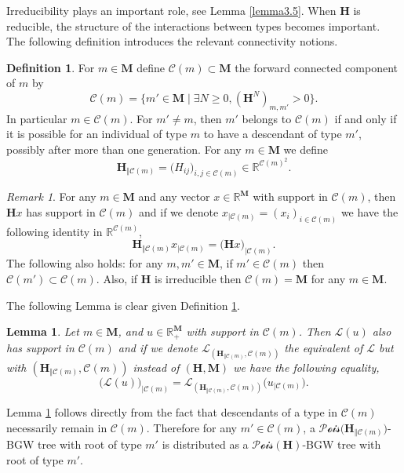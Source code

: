 \documentclass[reqno,final,11pt]{amsart}
\theoremstyle{plain}
\newtheorem{lemma}[theorem]{Lemma}
\theoremstyle{definition}
\newtheorem{definition}[theorem]{Definition}
\theoremstyle{remark}
\newtheorem{remark}[theorem]{Remark}
\newcommand{\R}{\mathds{R}}
\newcommand{\M}{\bm{M}}
\newcommand{\C}{\mathcal{C}}
\renewcommand{\L}{\bm{\mathscr{L}}}
\renewcommand{\H}{\bm{H}}
\newcommand{\pos}{\R_+^{\M}}
\newcommand{\Pois}{\mathscr{P}\!\mathscr{o}\!\mathscr{i}\!\mathscr{s}}
\begin{document}
Irreducibility plays an important role, see Lemma \ref{lemma3.5}. When $\H$ is reducible, the structure of the interactions between types becomes important. The following definition introduces the relevant connectivity notions.

\begin{definition}\label{definition5.3}
	For $m\in\M$ define $\C(m) \subset \M$ the forward connected component of $m$ by
	\begin{equation}
		\C(m) = \{ m'\in\M \mid \exists N \geq 0, (\H^N)_{m,m'} >0\}.
	\end{equation}
	In particular $m\in\C(m)$. For $m'\neq m$, then $m'$ belongs to $\C(m)$ if and only if it is possible for an individual of type $m$ to have a descendant of type $m'$, possibly after more than one generation. For any $m\in\M$ we define
	\begin{equation}
		\H_{\Vert \C(m)} = \big( H_{ij} \big)_{i,j \in \C(m)} \in \R^{\C(m)^2}.
	\end{equation}
\end{definition}

\begin{remark}\label{rmk7.8}
	For any $m\in\M$ and any vector $x\in\R^{\M}$ with support in $\C(m)$, then $\H x$ has support in $\C(m)$ and if we denote $x_{\vert \C(m)} = (x_i)_{i\in\C(m)}$ we have the following identity in $\R^{\C(m)}$, \[ \H_{\Vert \C(m)} x_{\vert \C(m)} = \big(\H x\big)_{\vert\C(m)}.\]
	The following also holds: for any $m,m'\in\M$, if $m'\in\C(m)$ then $\C(m') \subset \C(m)$. Also, if $\H$ is irreducible then $\C(m)=\M$ for any $m\in\M$.
\end{remark}

The following Lemma is clear given Definition \ref{definition5.3}.

\begin{lemma}\label{lemma5.5}
	Let $m\in\M$, and $u\in\pos$ with support in $\C(m)$. Then $\L(u)$ also has support in $\C(m)$ and if we denote $\L_{(\H_{\Vert \C(m)},\C(m))}$ the equivalent of $\L$ but with $(\H_{\Vert \C(m)},\C(m))$ instead of $(\H,\M)$ we have the following equality,
	\[\big(\L(u)\big)_{\vert \C(m)} = \L_{(\H_{\Vert \C(m)},\C(m))}\big(u_{\vert \C(m)}\big).\]
\end{lemma}

Lemma \ref{lemma5.5} follows directly from the fact that descendants of a type in $\C(m)$ necessarily remain in $\C(m)$. Therefore for any $m'\in \C(m)$, a $\Pois\big( \H_{\Vert \C(m)} \big)$-BGW tree with root of type $m'$ is distributed as a $\Pois(\H)$-BGW tree with root of type $m'$.
\end{document}
